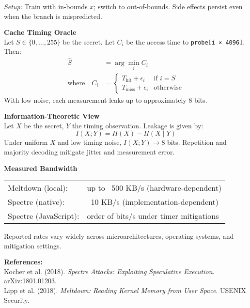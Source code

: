 \begin{technical}
\textit{Setup:} Train with in-bounds \( x \); switch to out-of-bounds. Side effects persist even when the branch is mispredicted.

\vspace{0.4em}
\textbf{Cache Timing Oracle}\\[0.5em]
Let \( S \in \{0,\dots,255\} \) be the secret. Let \( C_i \) be the access time to \texttt{probe[i × 4096]}. Then:
\[
\begin{aligned}
\hat{S} &= \arg\min_i C_i \\
\text{where} \quad
C_i &= 
\begin{cases}
T_\text{hit} + \epsilon_i & \text{if } i = S \\
T_\text{miss} + \epsilon_i & \text{otherwise}
\end{cases}
\end{aligned}
\]
With low noise, each measurement leaks up to approximately 8 bits.

\vspace{0.4em}
\textbf{Information-Theoretic View}\\[0.5em]
Let \( X \) be the secret, \( Y \) the timing observation. Leakage is given by:
\[
I(X; Y) = H(X) - H(X \mid Y)
\]
Under uniform \( X \) and low timing noise, \( I(X; Y) \to 8 \) bits. Repetition and majority decoding mitigate jitter and measurement error.

\vspace{0.4em}
\textbf{Measured Bandwidth}\\[0.5em]
\begin{tabular}{@{}ll@{}}
Meltdown (local):     & up to ~500 KB/s (hardware-dependent) \\
Spectre (native):     & ~10 KB/s (implementation-dependent) \\
Spectre (JavaScript): & order of bits/s under timer mitigations \\
\end{tabular}

Reported rates vary widely across microarchitectures, operating systems, and mitigation settings.

\vspace{0.5em}
\textbf{References:}\\
{\footnotesize
Kocher et al. (2018). \textit{Spectre Attacks: Exploiting Speculative Execution}. arXiv:1801.01203.\\
Lipp et al. (2018). \textit{Meltdown: Reading Kernel Memory from User Space}. USENIX Security.\\
}
\end{technical}

